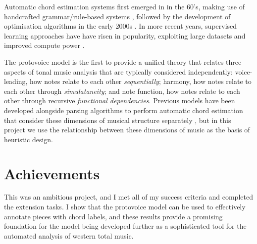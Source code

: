 \documentclass[12pt,a4paper,twoside,openright]{report}
\theoremstyle{definition}
\begin{document}
Automatic chord estimation systems first emerged in in the 60's, making use of handcrafted grammar/rule-based systems \cite{maxwellExpertSystemHarmonizing1992} \cite{winogradLinguisticsComputerAnalysis1968}, followed by the development of optimisation algorithms in the early 2000s \cite{pardoAlgorithmsChordalAnalysis2002}. In more recent years, supervised learning approaches have have risen in popularity, exploiting large datasets and improved compute power \cite{niEndtoendMachineLearning2011} \cite{mcleodModularSystemHarmonic2021} \cite{masadaChordRecognitionSymbolic2018}. 
\par 
The protovoice model is the first to provide a unified theory that relates three aspects of tonal music analysis that are typically considered independently: voice-leading, how notes relate to each other \textit{sequentially}; harmony, how notes relate to each other through \textit{simulataneity}; and note function, how notes relate to each other through recursive \textit{functional dependencies}. Previous models have been developed alongside parsing algorithms to perform automatic chord estimation that consider these dimensions of musical structure separately \cite{maxwellExpertSystemHarmonizing1992} \cite{winogradLinguisticsComputerAnalysis1968}, but in this project we use the relationship between these dimensions of music as the basis of heuristic design.
\par

\section{Achievements}

This was an ambitious project, and I met all of my success criteria and completed the extension tasks. I show that the protovoice model can be used to effectively annotate pieces with chord labels, and these results provide a promising foundation for the model being developed further as a sophisticated tool for the automated analysis of western total music.


\end{document}
